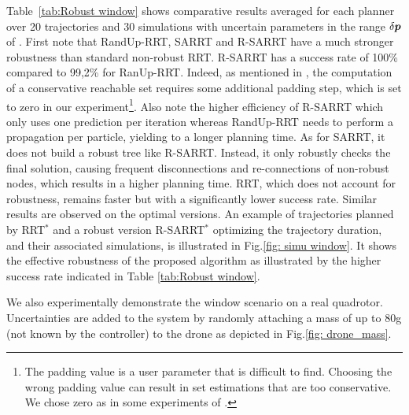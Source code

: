 Table~\ref{tab:Robust window} shows comparative results averaged for each planner over 20 trajectories and 30 simulations with uncertain parameters in the range $\delta\boldsymbol{p}$ of . 
First note that RandUp-RRT, SARRT and R-SARRT have a much stronger robustness than standard non-robust RRT. 
R-SARRT has a success rate of 100\% compared to 99,2\% for RanUp-RRT. 
Indeed, as mentioned in \cite{cRandUpRRT, cRandUP}, the computation of a conservative reachable set requires some additional padding step, which is set to zero in our experiment\footnote{The padding value is a user parameter that is difficult to find. Choosing the wrong padding value can result in set estimations that are too conservative. We chose zero as in some experiments of \cite{cRandUpRRT}.}. 
Also note the higher efficiency of R-SARRT which only uses one prediction per iteration whereas RandUp-RRT needs to perform a propagation per particle, yielding to a longer planning time. 
As for SARRT, it does not build a robust tree like R-SARRT. Instead, it only robustly checks the final solution, causing frequent disconnections and re-connections of non-robust nodes, which results in a higher planning time.
RRT, which does not account for robustness, remains faster but with a significantly lower success rate. 
Similar results are observed on the optimal versions. 
An example of trajectories planned by RRT$^*$ and a robust version R-SARRT$^*$ optimizing the trajectory duration, and their associated simulations, is illustrated in Fig.\ref{fig: simu window}.
It shows the effective robustness of the proposed algorithm as illustrated by the higher success rate indicated in Table \ref{tab:Robust window}.

We also experimentally demonstrate the window scenario on a real quadrotor.
Uncertainties are added to the system by randomly attaching a mass of up to 80g (not known by the controller) to the drone as depicted in Fig.\ref{fig: drone_mass}.




